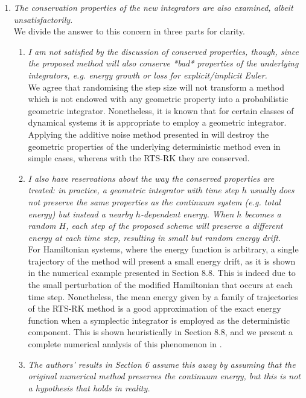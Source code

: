 \documentclass{siamart1116}
\numberwithin{theorem}{section}
\begin{document}
\begin{enumerate}[label=\arabic{*}.]
	\item \textit{The conservation properties of the new integrators are also examined, albeit unsatisfactorily.} \\ We divide the answer to this concern in three parts for clarity.	
	\begin{enumerate}
		\item \textit{I am not satisfied by the discussion of conserved properties, though, since the proposed method will also conserve *bad* properties of the underlying integrators, e.g. energy growth or loss for explicit/implicit Euler.} \\ 
		We agree that randomising the step size will not transform a method which is not endowed with any geometric property into a probabilistic geometric integrator. Nonetheless, it is known that for certain classes of dynamical systems it is appropriate to employ a geometric integrator. Applying the additive noise method presented in \cite{CGS16} will destroy the geometric properties of the underlying deterministic method even in simple cases, whereas with the RTS-RK they are conserved.
		\item \textit{I also have reservations about the way the conserved properties are treated: in practice, a geometric integrator with time step $h$ usually does not preserve the same properties as the continuum system (e.g. total energy) but instead a nearby $h$-dependent energy. When $h$ becomes a random $H$, each step of the proposed scheme will preserve a different energy at each time step, resulting in small but random energy drift.} \\ 
		For Hamiltonian systems, where the energy function is arbitrary, a single trajectory of the method will present a small energy drift, as it is shown in the numerical example presented in Section 8.8. This is indeed due to the small perturbation of the modified Hamiltonian that occurs at each time step. Nonetheless, the mean energy given by a family of trajectories of the RTS-RK method is a good approximation of the exact energy function when a symplectic integrator is employed as the deterministic component. This is shown heuristically in Section 8.8, and we present a complete numerical analysis of this phenomenon in \cite{AbG18b}.
		\item \textit{The authors' results in Section 6 assume this away by assuming that the original numerical method preserves the continuum energy, but this is not a hypothesis that holds in reality.} \\ 

\end{enumerate}
\end{enumerate}
\end{document}
